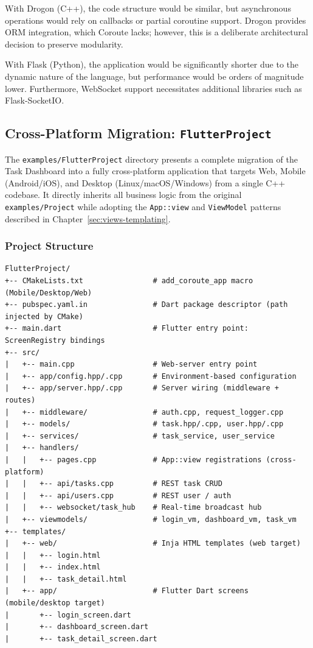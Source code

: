 With Drogon (C++), the code structure would be similar, but asynchronous operations would rely on callbacks or partial coroutine support. Drogon provides ORM integration, which Coroute lacks; however, this is a deliberate architectural decision to preserve modularity.

With Flask (Python), the application would be significantly shorter due to the dynamic nature of the language, but performance would be orders of magnitude lower. Furthermore, WebSocket support necessitates additional libraries such as Flask-SocketIO.

\subsection{Cross-Platform Migration: \texttt{FlutterProject}}
\label{sec:flutter-project}

The \texttt{examples/FlutterProject} directory presents a complete migration of the Task Dashboard into a fully cross-platform application that targets Web, Mobile (Android/iOS), and Desktop (Linux/macOS/Windows) from a single C++ codebase. It directly inherits all business logic from the original \texttt{examples/Project} while adopting the \texttt{App::view} and \texttt{ViewModel} patterns described in Chapter~\ref{sec:views-templating}.

\subsubsection{Project Structure}

\begin{lstlisting}[basicstyle=\small\ttfamily, frame=none, numbers=none]
FlutterProject/
+-- CMakeLists.txt                # add_coroute_app macro (Mobile/Desktop/Web)
+-- pubspec.yaml.in               # Dart package descriptor (path injected by CMake)
+-- main.dart                     # Flutter entry point: ScreenRegistry bindings
+-- src/
|   +-- main.cpp                  # Web-server entry point
|   +-- app/config.hpp/.cpp       # Environment-based configuration
|   +-- app/server.hpp/.cpp       # Server wiring (middleware + routes)
|   +-- middleware/               # auth.cpp, request_logger.cpp
|   +-- models/                   # task.hpp/.cpp, user.hpp/.cpp
|   +-- services/                 # task_service, user_service
|   +-- handlers/
|   |   +-- pages.cpp             # App::view registrations (cross-platform)
|   |   +-- api/tasks.cpp         # REST task CRUD
|   |   +-- api/users.cpp         # REST user / auth
|   |   +-- websocket/task_hub    # Real-time broadcast hub
|   +-- viewmodels/               # login_vm, dashboard_vm, task_vm
+-- templates/
|   +-- web/                      # Inja HTML templates (web target)
|   |   +-- login.html
|   |   +-- index.html
|   |   +-- task_detail.html
|   +-- app/                      # Flutter Dart screens (mobile/desktop target)
|       +-- login_screen.dart
|       +-- dashboard_screen.dart
|       +-- task_detail_screen.dart
\end{lstlisting}

